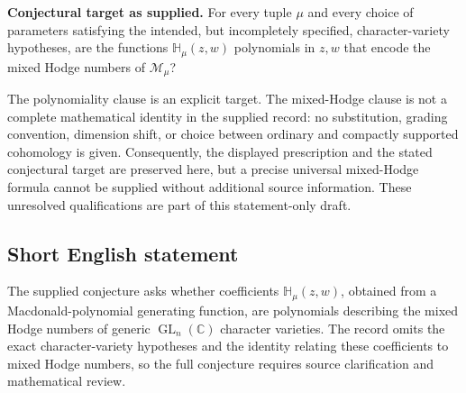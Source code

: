 \documentclass[11pt]{article}
\newcommand{\C}{\mathbb{C}}
\begin{document}
\textbf{Conjectural target as supplied.} For every tuple \(\mu\) and every choice of parameters satisfying the intended, but incompletely specified, character-variety hypotheses, are the functions \(\mathbb H_\mu(z,w)\) polynomials in \(z,w\) that encode the mixed Hodge numbers of \(\mathcal M_\mu\)?

The polynomiality clause is an explicit target. The mixed-Hodge clause is not a complete mathematical identity in the supplied record: no substitution, grading convention, dimension shift, or choice between ordinary and compactly supported cohomology is given. Consequently, the displayed prescription and the stated conjectural target are preserved here, but a precise universal mixed-Hodge formula cannot be supplied without additional source information. These unresolved qualifications are part of this statement-only draft.
\subsection{Short English statement}
The supplied conjecture asks whether coefficients \(\mathbb H_\mu(z,w)\), obtained from a Macdonald-polynomial generating function, are polynomials describing the mixed Hodge numbers of generic \(\operatorname{GL}_n(\C)\) character varieties. The record omits the exact character-variety hypotheses and the identity relating these coefficients to mixed Hodge numbers, so the full conjecture requires source clarification and mathematical review.
\end{document}
